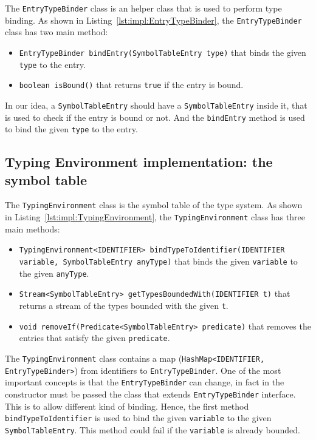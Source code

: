 The \texttt{EntryTypeBinder} class is an helper class that is used to perform type binding. As shown in Listing~\ref{lst:impl:EntryTypeBinder}, the \texttt{EntryTypeBinder} class has two main method:
\begin{itemize}
    \item \texttt{EntryTypeBinder bindEntry(SymbolTableEntry type)} that binds the given \texttt{type} to the entry.
    \item \texttt{boolean isBound()} that returns \texttt{true} if the entry is bound.
\end{itemize}

In our idea, a \texttt{SymbolTableEntry} should have a \texttt{SymbolTableEntry} inside it, that is used to check if the entry is bound or not. And the \texttt{bindEntry} method is used to bind the given \texttt{type} to the entry.

\subsection{Typing Environment implementation: the symbol table}\label{subsec:impl:TypingEnvironment}


The \texttt{TypingEnvironment} class is the symbol table of the type system. As shown in Listing~\ref{lst:impl:TypingEnvironment}, the \texttt{TypingEnvironment} class has three main methods:

\begin{itemize}
    \item \texttt{TypingEnvironment<IDENTIFIER> bindTypeToIdentifier(IDENTIFIER variable, SymbolTableEntry anyType)} that binds the given \texttt{variable} to the given \texttt{anyType}.
    \item \texttt{Stream<SymbolTableEntry> getTypesBoundedWith(IDENTIFIER t)} that returns a stream of the types bounded with the given \texttt{t}.
    \item \texttt{void removeIf(Predicate<SymbolTableEntry> predicate)} that removes the entries that satisfy the given \texttt{predicate}.
\end{itemize}

The \texttt{TypingEnvironment} class contains a map (\texttt{HashMap<IDENTIFIER, EntryTypeBinder>}) from identifiers to \texttt{EntryTypeBinder}. One of the most important concepts is that the \texttt{EntryTypeBinder} can change, in fact in the constructor must be passed the class that extends \texttt{EntryTypeBinder} interface. This is to allow different kind of binding.
Hence, the first method \texttt{bindTypeToIdentifier} is used to bind the given \texttt{variable} to the given \texttt{SymbolTableEntry}. This method could fail if the \texttt{variable} is already bounded.


